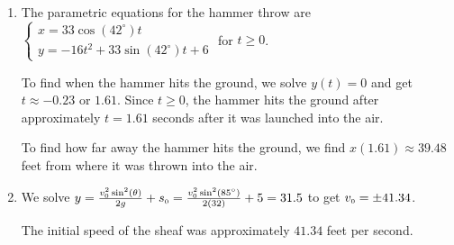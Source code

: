 \documentclass{ximera}
\begin{document}
\begin{enumerate} 
\setcounter{enumi}{\value{HW}}

\item  The parametric equations for the hammer throw are ${\displaystyle \left\{ \begin{array}{l} x = 33 \cos(42^{\circ}) t \\ [4pt] y =-16t^2 +  33 \sin(42^{\circ}) t + 6 \end{array} \right.}$ for $t \geq 0$.  

\smallskip

To find when the hammer hits the ground, we solve $y(t) = 0$ and get $t \approx -0.23$ or $1.61$.  Since $t \geq 0$, the hammer hits the ground after approximately $t = 1.61$ seconds after it was launched into the air.  

\smallskip

To find how far away the hammer hits the ground, we find $x(1.61) \approx 39.48$ feet from where it was thrown into the air.

\addtocounter{enumi}{1}

\item  We solve $y = \frac{v_{\text{\tiny$0$}}^2 \sin^{2}(\theta)}{2g} + s_{\text{\tiny $0$}}  = \frac{v_{\text{\tiny$0$}}^2 \sin^{2}(85^{\circ})}{2(32)} + 5 = 31.5$ to get $v_{\text{\tiny$0$}} = \pm 41.34$.  

\smallskip

The initial speed of the sheaf was approximately $41.34$ feet per second.

\setcounter{HW}{\value{enumi}}
\end{enumerate}
\end{document}
